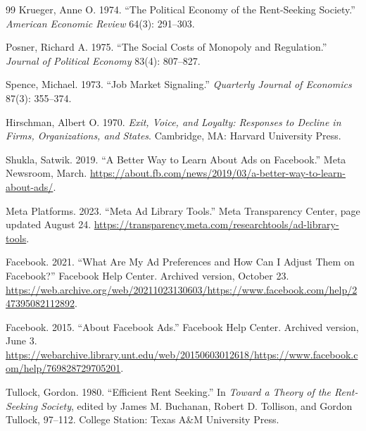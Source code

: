 \documentclass[11pt]{article}
\theoremstyle{definition}
\begin{document}
\begin{thebibliography}{99}
Krueger, Anne O. 1974. ``The Political Economy of the Rent-Seeking Society.'' \emph{American Economic Review} 64(3): 291--303.

Posner, Richard A. 1975. ``The Social Costs of Monopoly and Regulation.'' \emph{Journal of Political Economy} 83(4): 807--827.

Spence, Michael. 1973. ``Job Market Signaling.'' \emph{Quarterly Journal of Economics} 87(3): 355--374.

Hirschman, Albert O. 1970. \emph{Exit, Voice, and Loyalty: Responses to Decline in Firms, Organizations, and States}. Cambridge, MA: Harvard University Press.

Shukla, Satwik. 2019. ``A Better Way to Learn About Ads on Facebook.'' Meta Newsroom, March. \url{https://about.fb.com/news/2019/03/a-better-way-to-learn-about-ads/}.

Meta Platforms. 2023. ``Meta Ad Library Tools.'' Meta Transparency Center, page updated August 24. \url{https://transparency.meta.com/researchtools/ad-library-tools}.

Facebook. 2021. ``What Are My Ad Preferences and How Can I Adjust Them on Facebook?'' Facebook Help Center. Archived version, October 23. \url{https://web.archive.org/web/20211023130603/https://www.facebook.com/help/247395082112892}.

Facebook. 2015. ``About Facebook Ads.'' Facebook Help Center. Archived version, June 3. \url{https://webarchive.library.unt.edu/web/20150603012618/https://www.facebook.com/help/769828729705201}.

Tullock, Gordon. 1980. ``Efficient Rent Seeking.'' In \emph{Toward a Theory of the Rent-Seeking Society}, edited by James M. Buchanan, Robert D. Tollison, and Gordon Tullock, 97--112. College Station: Texas A\&M University Press.

\end{thebibliography}
\end{document}
